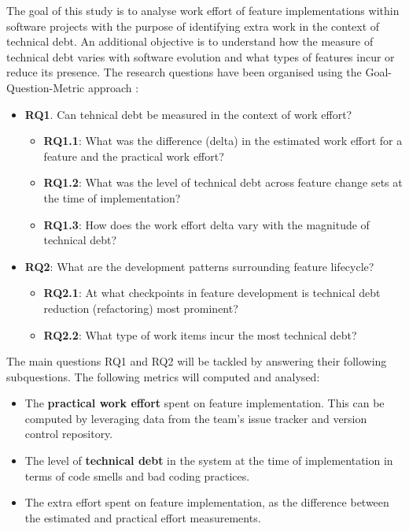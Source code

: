\documentclass{mprop}
\begin{document}
The goal of this study is to analyse work effort of feature implementations
within software projects with the purpose of identifying extra work in the
context of technical debt. An additional objective is to understand how the
measure of technical debt varies with software evolution and what types of
features incur or reduce its presence. The research questions have been
organised using the Goal-Question-Metric approach \cite{VanSolingen2002}:
\begin{itemize}
	\item \textbf{RQ1}. Can tehnical debt be measured in the context of work
	effort?
	      \begin{itemize}
		      \item \textbf{RQ1.1}: What was the difference (delta) in the
		            estimated work effort for a feature and the practical work
		            effort?
			  \item \textbf{RQ1.2}: What was the level of technical debt across
		            feature change sets at the time of implementation?
		      \item \textbf{RQ1.3}: How does the work effort delta vary with the
		            magnitude of technical debt?
		  \end{itemize}
	\item \textbf{RQ2}: What are the development patterns surrounding feature
	      lifecycle?
	      \begin{itemize}
		      \item \textbf{RQ2.1}: At what checkpoints in feature development
		            is technical debt reduction (refactoring) most prominent?
		      \item \textbf{RQ2.2}: What type of work items incur the most
					technical debt?
	      \end{itemize}
\end{itemize}

The main questions RQ1 and RQ2 will be tackled by answering their following
subquestions. The following metrics will computed and analysed:
\begin{itemize}
	\item The \textbf{practical work effort} spent on feature implementation.
	This can be computed by leveraging data from the team's issue tracker and
	version control repository.  
	\item The level of \textbf{technical debt} in the system at the time of
	implementation in terms of code smells and bad coding practices.
	\item The extra effort spent on feature implementation, as the difference
	between the estimated and practical effort measurements. 
\end{itemize}
\end{document}
